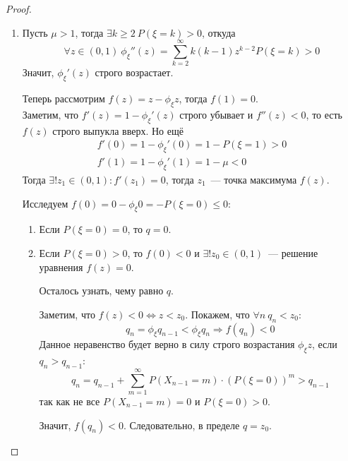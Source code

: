 \begin{proof}
\begin{enumerate}
    \item Пусть $\mu > 1$, тогда $\exists k \geq 2 \ P(\xi = k) > 0$, откуда 
    $$
    \forall z \in (0, 1) \ \phi_{\xi}''(z) = \sum\limits_{k = 2}^\infty k(k - 1) z^{k - 2} P(\xi = k) > 0
    $$
    Значит, $\phi_{\xi}'(z)$ строго возрастает.
    
    Теперь рассмотрим $f(z) = z - \phi_{\xi}{z}$, тогда $f(1) = 0$.\\ Заметим, что $f'(z) = 1 - \phi_{\xi}'(z)$ строго убывает и $f''(z) < 0$, то есть $f(z)$ строго выпукла вверх. Но ещё
    \begin{gather*}
        f'(0) = 1 - \phi_{\xi}'(0) = 1 - P(\xi = 1) > 0 \\
        f'(1) = 1 - \phi_{\xi}'(1) = 1 - \mu < 0
    \end{gather*}
    Тогда $\exists ! z_1 \in (0, 1): f'(z_1) = 0$, тогда $z_1$~--- точка максимума $f(z)$.
    
    Исследуем $f(0) = 0 - \phi_{\xi}{0} = -P(\xi = 0) \leq 0$:
    
    \begin{enumerate}
        \item Если $P(\xi = 0) = 0$, то $q = 0$.
        \item Если $P(\xi = 0) > 0$, то $f(0) < 0$ и $\exists ! z_0 \in (0, 1)$~--- решение уравнения $f(z) = 0$.
        
        Осталось узнать, чему равно $q$.
        
        Заметим, что $f(z) < 0 \Longleftrightarrow z < z_0$. Покажем, что $\forall n \ q_n < z_0$:
        \begin{equation*}
            q_n = \phi_{\xi}{q_{n - 1}} < \phi_{\xi}{q_n} \Longrightarrow f(q_n) < 0
        \end{equation*}
        Данное неравенство будет верно в силу строго возрастания $\phi_{\xi}{z}$, если $q_n > q_{n - 1}$:
        \begin{equation*}
            q_n = q_{n - 1} + \sum\limits_{m = 1}^\infty P(X_{n - 1} = m) \cdot (P(\xi = 0))^m > q_{n - 1}
        \end{equation*}
        так как не все $P(X_{n - 1} = m) = 0$ и $P(\xi = 0) > 0$.
        
        Значит, $f(q_n) < 0$. Следовательно, в пределе $q = z_0$.
    \end{enumerate}
\end{enumerate}

\end{proof}